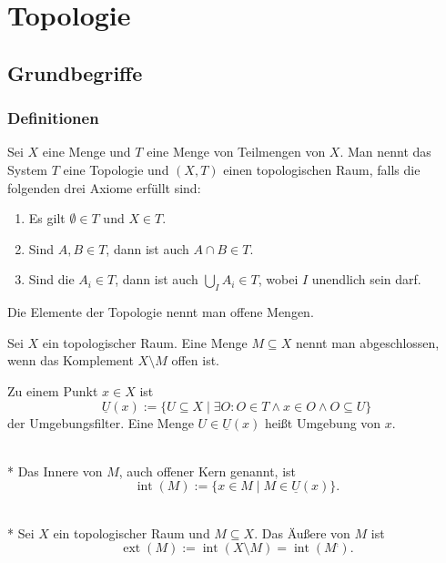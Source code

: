 
\chapter{Topologie}
\section{Grundbegriffe}
\subsection{Definitionen}

\begin{Definition}
Sei $X$ eine Menge und $T$ eine Menge von Teilmengen von $X$.
Man nennt das System $T$ eine Topologie und $(X,T)$ einen topologischen
Raum, falls die folgenden drei Axiome erfüllt sind:
\begin{enumerate}
\item Es gilt $\emptyset\in T$ und $X\in T$.
\item Sind $A,B\in T$, dann ist auch $A\cap B\in T$.
\item Sind die $A_i\in T$, dann ist auch $\bigcup_I A_i\in T$, wobei $I$ unendlich sein darf.
\end{enumerate}
Die Elemente der Topologie nennt man offene Mengen.
\end{Definition}

\begin{Definition}
Sei $X$ ein topologischer Raum. Eine Menge $M\subseteq X$
nennt man abgeschlossen, wenn das Komplement $X\setminus M$ offen ist.
\end{Definition}

\begin{Definition}%
\label{def:nh-filter}
Zu einem Punkt $x\in X$ ist
\[\underline U(x) := \{U{\subseteq}X\mid
\exists O\colon O\in T\land x\in O\land O\subseteq U\}\]
der Umgebungsfilter. Eine Menge $U\in\underline U(x)$ heißt
Umgebung von $x$.
\end{Definition}

\begin{Definition}\mbox{}\\*
\label{def:int}%
Das Innere von $M$, auch offener Kern genannt, ist
\[\operatorname{int}(M) := \{x\in M\mid M\in \underline U(x)\}.\]
\end{Definition}

\begin{Definition}\mbox{}\\*
Sei $X$ ein topologischer Raum und $M\subseteq X$. Das Äußere von $M$ ist
\[\operatorname{ext}(M) := \operatorname{int}(X\setminus M) = \operatorname{int}(M^\comp).\]
\end{Definition}

